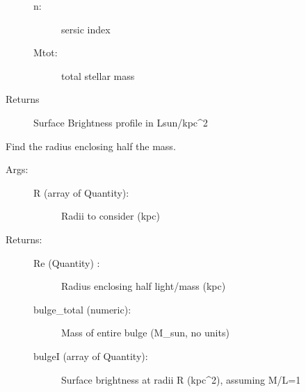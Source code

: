 \documentclass[letterpaper,10pt,english]{sphinxmanual}
\begin{document}
\begin{fulllineitems}
\begin{fulllineitems}
\begin{description}
\begin{description}
\item[{n:}] \leavevmode
sersic index

\item[{Mtot:}] \leavevmode
total stellar mass

\end{description}

\item[{Returns}] \leavevmode
Surface Brightness profile in Lsun/kpc\textasciicircum{}2

\end{description}

\end{fulllineitems}


\begin{fulllineitems}
\label{\detokenize{remnant:galaxy.remnant.Remnant.Re}}
Find the radius enclosing half the mass.
\begin{description}
\item[{Args:}] \leavevmode\begin{description}
\item[{R (array of Quantity):}] \leavevmode
Radii to consider (kpc)

\end{description}

\item[{Returns:}] \leavevmode\begin{description}
\item[{Re (Quantity) :}] \leavevmode
Radius enclosing half light/mass (kpc)

\item[{bulge\_total (numeric):}] \leavevmode
Mass of entire bulge (M\_sun, no units)

\item[{bulgeI (array of Quantity):}] \leavevmode
Surface brightness at radii R (kpc\textasciicircum{}\sphinxhyphen{}2), assuming M/L=1

\end{description}

\end{description}

\end{fulllineitems}



\end{fulllineitems}
\end{document}
